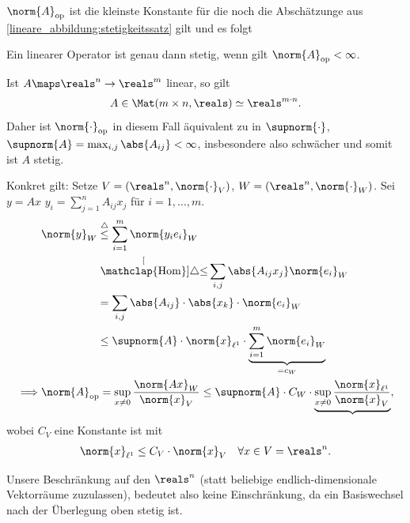     \( \norm{A}_{\text{op}} \) ist die kleinste Konstante für die noch die Abschätzunge aus \ref{lineare_abbildung:stetigkeitssatz} gilt und es folgt
\begin{bemerkung}
    Ein linearer Operator ist genau dann stetig, wenn gilt \( \norm{A}_{\text{op}}<\infty \).
\end{bemerkung}
\begin{beispiel*}
    Ist \( A\maps \reals^n \to \reals^m \) linear, so gilt 
    \begin{align*}
        A\in \Mat(m\times n,\reals)\simeq \reals^{m\cdot n}.
    \end{align*}
    Daher ist \( \norm{\cdot}_{\text{op}} \) in diesem Fall äquivalent zu in \( \supnorm{\cdot} \), \( \supnorm{A}=\max_{i,j}\abs{A_{ij}}<\infty \), insbesondere also schwächer und somit ist \( A \) stetig.

    Konkret gilt: Setze \( V=(\reals^n, \norm{\cdot}_{V}) \), \( W=(\reals^n,\norm{\cdot}_W) \).
    Sei \( y=Ax \) \timplies \( y_i=\sum_{j=1}^{n}A_{ij}x_j\) für \( i=1,\dotsc,m \).
    \begin{align*}
        &\norm{y}_{W}\begin{aligned}[t]
            &\overset{\triangle}{\leq}\sum_{i=1}^{m}\norm{y_i e_i}_{W}\\
            &\stackrel[\mathclap{\text{Hom}}]{\triangle}{\leq}\sum_{i,j}\abs{A_{ij}x_j}\norm{e_i}_{W}\\
            &=\sum_{i,j}\abs{A_{ij}}\cdot\abs{x_k}\cdot\norm{e_i}_{W}\\
            &\leq \supnorm{A}\cdot\norm{x}_{\ell^1}\cdot \underbrace{\sum_{i=1}^{m}\norm{e_i}_W}_{=c_W}
        \end{aligned}\\
        \implies &\norm{A}_{\text{op}}=\sup_{x\neq 0}\frac{\norm{Ax}_{W}}{\norm{x}_V}\leq \supnorm{A}\cdot C_W\cdot\underbrace{\sup_{x\neq 0}\frac{\norm{x}_{\ell^1}}{\norm{x}_V}},        
    \end{align*}
    wobei \( C_V \) eine Konstante ist mit
    \begin{align*}
        \norm{x}_{\ell^1}\leq C_V\cdot \norm{x}_V\quad \forall x\in V=\reals^n.
    \end{align*}
\end{beispiel*}
\begin{bemerkung*}
    Unsere Beschränkung auf den \( \reals^n \) (statt beliebige endlich-dimensionale Vektorräume zuzulassen), bedeutet also keine Einschränkung, da ein Basiswechsel nach der Überlegung oben stetig ist.
\end{bemerkung*}
